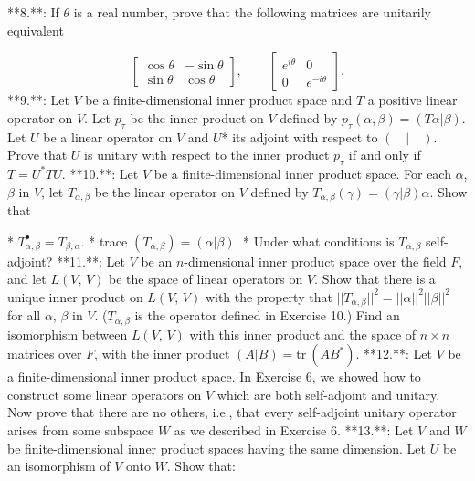 

**8.**: If \(\theta\) is a real number, prove that the following matrices are unitarily equivalent

\[\begin{bmatrix}\cos\theta&-\sin\theta\\ \sin\theta&\cos\theta\end{bmatrix},\quad\quad\begin{bmatrix}e^{i\theta}&0\\ 0&e^{-i\theta}\end{bmatrix}.\]
**9.**: Let \(V\) be a finite-dimensional inner product space and \(T\) a positive linear operator on \(V\). Let \(p_{\tau}\) be the inner product on \(V\) defined by \(p_{\tau}(\alpha,\beta)=(T\alpha|\beta)\). Let \(U\) be a linear operator on \(V\) and \(U\)* its adjoint with respect to \((\quad|\quad)\). Prove that \(U\) is unitary with respect to the inner product \(p_{\tau}\) if and only if \(T=U^{*}TU\).
**10.**: Let \(V\) be a finite-dimensional inner product space. For each \(\alpha\), \(\beta\) in \(V\), let \(T_{\alpha,\beta}\) be the linear operator on \(V\) defined by \(T_{\alpha,\beta}(\gamma)=(\gamma|\beta)\alpha\). Show that

* \(T_{\alpha,\beta}^{\bullet}=T_{\beta,\alpha}\).
* trace \((T_{\alpha,\beta})=(\alpha|\beta)\).
* Under what conditions is \(T_{\alpha,\beta}\) self-adjoint?
**11.**: Let \(V\) be an \(n\)-dimensional inner product space over the field \(F\), and let \(L(V,\,V)\) be the space of linear operators on \(V\). Show that there is a unique inner product on \(L(V,\,V)\) with the property that \(||T_{\alpha,\beta}||^{2}=||\alpha||^{2}||\beta||^{2}\) for all \(\alpha\), \(\beta\) in \(V\). (\(T_{\alpha,\beta}\) is the operator defined in Exercise 10.) Find an isomorphism between \(L(V,\,V)\) with this inner product and the space of \(n\times n\) matrices over \(F\), with the inner product \((A|B)=\text{tr}\ (AB^{*})\).
**12.**: Let \(V\) be a finite-dimensional inner product space. In Exercise 6, we showed how to construct some linear operators on \(V\) which are both self-adjoint and unitary. Now prove that there are no others, i.e., that every self-adjoint unitary operator arises from some subspace \(W\) as we described in Exercise 6.
**13.**: Let \(V\) and \(W\) be finite-dimensional inner product spaces having the same dimension. Let \(U\) be an isomorphism of \(V\) onto \(W\). Show that:


